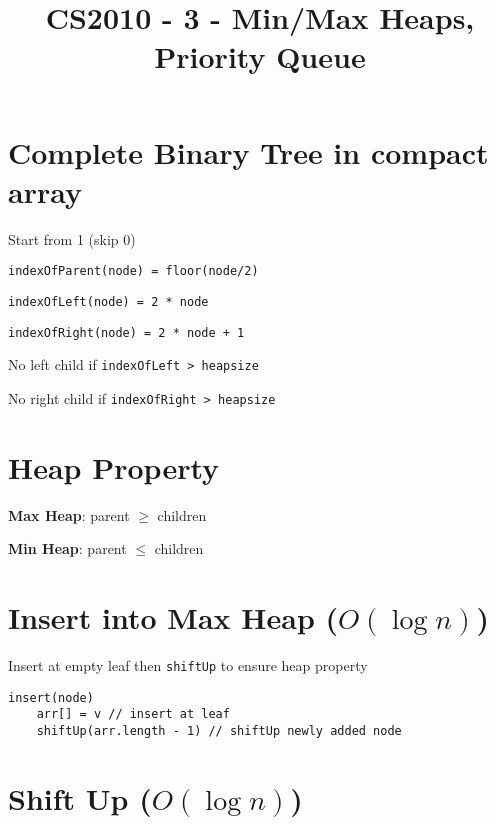 \documentclass[12pt]{article}
\title{\textbf{CS2010 - 3 - Min/Max Heaps, Priority Queue}}
\date{}
\begin{document}
\maketitle

\begin{spacing}{1.5}

\section{Complete Binary Tree in compact array}

Start from 1 (skip 0)

\begin{itemize*}
	\item \texttt{indexOfParent(node) = floor(node/2)}
	\item \texttt{indexOfLeft(node) = 2 * node} 
	\item \texttt{indexOfRight(node) = 2 * node + 1}
	\item No left child if \texttt{indexOfLeft > heapsize}
	\item No right child if \texttt{indexOfRight > heapsize}
\end{itemize*}

\section{Heap Property}

\begin{itemize*}
	\item \textbf{Max Heap}: parent $\ge$ children
	\item \textbf{Min Heap}: parent $\le$ children
\end{itemize*}

\section{Insert into Max Heap ($O(\log{n})$)}

Insert at empty leaf then \texttt{shiftUp} to ensure heap property

\begin{verbatim}
insert(node) 
    arr[] = v // insert at leaf
    shiftUp(arr.length - 1) // shiftUp newly added node
\end{verbatim}

\section{Shift Up ($O(\log{n})$)}


\end{spacing}
\end{document}
